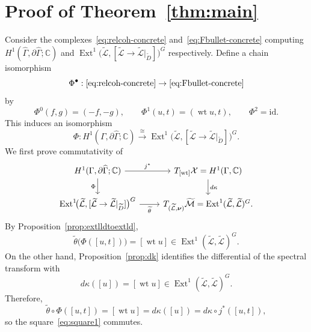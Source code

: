 \documentclass[dvipsnames,11pt]{article}
\theoremstyle{definition}
\newcommand{\wt}{\operatorname{wt}}
\newcommand{\C}{{\mathbb C}}
\def\graph{\Gamma}
\def\id{\mathrm{id}}
\def\Ext{\operatorname{Ext}}
\def\Ext{\operatorname{Ext}}
\begin{document}

\section{Proof of Theorem~\ref{thm:main}} \label{sec:last}

Consider the complexes~\eqref{eq:relcoh-concrete} and~\eqref{eq:Fbullet-concrete}
computing \(H^1(\widehat \Gamma,\partial \widehat \Gamma;\C)\) and \(
\Ext^1\!\bigl(\widetilde{\mathcal L},[\widetilde{\mathcal L}\to \widetilde{\mathcal L}|_{\widetilde D}]
\bigr)^G \) respectively. Define a chain isomorphism
\[
\Phi^\bullet:\eqref{eq:relcoh-concrete} \rightarrow\eqref{eq:Fbullet-concrete}
\]
by
\[
\Phi^0(f,g)=(-f,-g),\qquad
\Phi^1(u,t)=(\wt u,t),\qquad
\Phi^2=\id.
\]
This induces an isomorphism
\[
\Phi:H^1(\Gamma,\partial \widehat \Gamma;\C)
\xrightarrow{\cong}
\Ext^1\!\bigl(\widetilde{\mathcal L},
[\widetilde{\mathcal L}\to \widetilde{\mathcal L}|_{\widetilde D}]
\bigr)^G.
\]
We first prove commutativity of
\begin{equation}\label{eq:square1}
\begin{tikzcd}
H^1(\Gamma,\partial \widehat \Gamma;\C)
  \arrow[r,"j^*"]
  \arrow[d,"\Phi"']
&
T_{[\wt]}\mathcal X=H^1(\graph,\C)
  \arrow[d,"d\kappa"]\\
\Ext^1\!\bigl(\widetilde{\mathcal L},
[\widetilde{\mathcal L}\to \widetilde{\mathcal L}|_{\widetilde D}]
\bigr)^G
  \arrow[r,"\widetilde\theta"']
&
T_{(\widetilde{\mathcal L},\bm\nu)}\widetilde{\mathcal M}
=
\Ext^1(\widetilde{\mathcal L},\widetilde{\mathcal L})^G.
\end{tikzcd}
\end{equation}
By Proposition~\ref{prop:extlldtoextld},
\[
\widetilde\theta\bigl(\Phi([u,t])\bigr)
=
[\wt u]
\in
\Ext^1(\widetilde{\mathcal L},\widetilde{\mathcal L})^G.
\]
On the other hand, Proposition~\ref{prop:dk} identifies the differential of the spectral
transform with
\[
d\kappa([u])=[\wt u]
\in
\Ext^1(\widetilde{\mathcal L},\widetilde{\mathcal L})^G.
\]
Therefore,
\[
\widetilde\theta\circ\Phi([u,t])
=
[\wt u]
=
d\kappa([u])
=
d\kappa\circ j^*([u,t]),
\]
so the square~\eqref{eq:square1} commutes.
\end{document}
